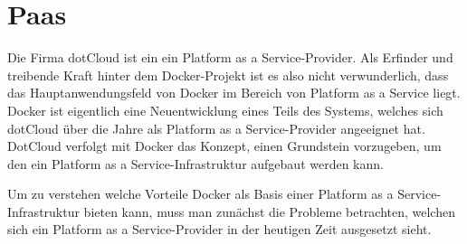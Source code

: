 \section{Paas}
\label{sec:paas}
Die Firma dotCloud ist ein ein Platform as a Service-Provider. Als Erfinder und treibende Kraft hinter dem Docker-Projekt ist es also nicht verwunderlich, dass das Hauptanwendungsfeld von Docker im Bereich von Platform as a Service liegt.
Docker ist eigentlich eine Neuentwicklung eines Teils des Systems, welches sich dotCloud über die Jahre als 
Platform as a Service-Provider angeeignet hat. DotCloud verfolgt mit Docker das Konzept, einen Grundstein vorzugeben, um den ein Platform as a Service-Infrastruktur aufgebaut werden kann.\cite[Zeit 18:24]{hykes_introduction_2013}

Um zu verstehen welche Vorteile Docker als Basis einer Platform as a Service-Infrastruktur bieten kann, muss man zunächst die Probleme betrachten, welchen sich ein Platform as a Service-Provider in der heutigen Zeit ausgesetzt sieht.
